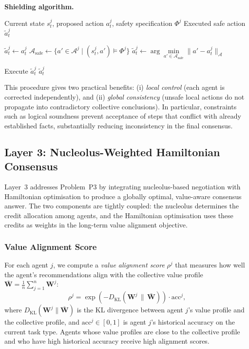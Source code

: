 \documentclass[12pt,a4paper]{article}
\newcommand{\bW}{\bm{W}}
\newcommand{\dkl}{D_{\mathrm{KL}}}
\begin{document}
\noindent\textbf{Shielding algorithm.}

\begin{algorithm}[H]
\caption{Per-Agent Runtime Shielding}
\label{alg:shielding}
\begin{algorithmic}[1]
\Require Current state $s_t^j$, proposed action $a_t^j$, safety specification $\Phi^j$
\Ensure Executed safe action $\tilde{a}_t^j$

    \State $\tilde{a}_t^j \gets a_t^j$ 
\Else
    \State $\mathcal{A}_{\text{safe}} \gets \{a' \in \mathcal{A}^j \mid (s_t^j, a') \models \Phi^j\}$
    \State $\tilde{a}_t^j \gets \arg\min\limits_{a' \in \mathcal{A}_{\text{safe}}} \|a' - a_t^j\|_{\mathcal{A}}$
\EndIf

\State Execute $\tilde{a}_t^j$
\State \Return $\tilde{a}_t^j$
\end{algorithmic}
\end{algorithm}


This procedure gives two practical benefits: (i) \emph{local control} (each agent is
corrected independently), and (ii) \emph{global consistency} (unsafe local actions do
not propagate into contradictory collective conclusions). In particular, constraints
such as logical soundness prevent acceptance of steps that conflict with already
established facts, substantially reducing inconsistency in the final consensus.


\subsection{Layer 3: Nucleolus-Weighted Hamiltonian Consensus}
\label{sec:layer3}

Layer~3 addresses Problem~P3 by integrating nucleolus-based negotiation with
Hamiltonian optimisation to produce a globally optimal, value-aware consensus answer.
The two components are tightly coupled: the nucleolus determines the credit allocation
among agents, and the Hamiltonian optimisation uses these credits as weights in the
long-term value alignment objective.

\subsubsection{Value Alignment Score}

For each agent $j$, we compute a \emph{value alignment score} $\rho^j$ that measures
how well the agent's recommendations align with the collective value profile
$\bar{\bW} = \frac{1}{n} \sum_{j=1}^n \bW^j$:
\begin{equation}
  \rho^j = \exp\!\left(-\dkl\!\left(\bW^j \,\|\, \bar{\bW}\right)\right) \cdot
  \mathrm{acc}^j,
  \label{eq:value_alignment_score}
\end{equation}
where $\dkl(\bW^j \| \bar{\bW})$ is the KL divergence between agent $j$'s value
profile and the collective profile, and $\mathrm{acc}^j \in [0,1]$ is agent $j$'s
historical accuracy on the current task type. Agents whose value profiles are close to
the collective profile and who have high historical accuracy receive high alignment
scores.
\end{document}
